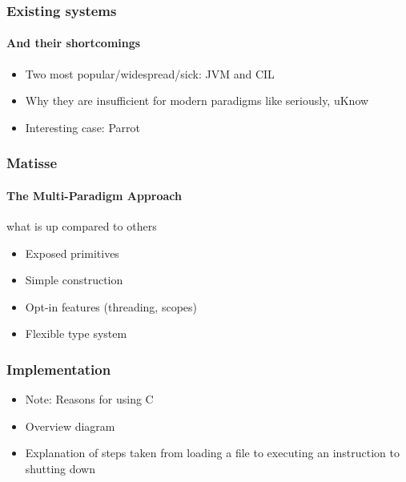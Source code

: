\documentclass[handout]{beamer}
\begin{document}
\begin{frame}
  \frametitle{Existing systems}
  \framesubtitle{And their shortcomings}

  \begin{itemize}
  \item Two most popular/widespread/sick: JVM and CIL
  \item Why they are insufficient for modern paradigms like seriously, uKnow
  \item Interesting case: Parrot
  \end{itemize}
\end{frame}

\begin{frame}
  \frametitle{Matisse}
  \framesubtitle{The Multi-Paradigm Approach}

  what is up compared to others
  \begin{itemize}
  \item Exposed primitives
  \item Simple construction
  \item Opt-in features (threading, scopes)
  \item Flexible type system
  \end{itemize}
\end{frame}

\begin{frame}
  \frametitle{Implementation}

  \begin{itemize}
  \item Note: Reasons for using C
  \item Overview diagram
  \item Explanation of steps taken from loading a file to executing an
    instruction to shutting down
  \end{itemize}
\end{frame}
\end{document}
